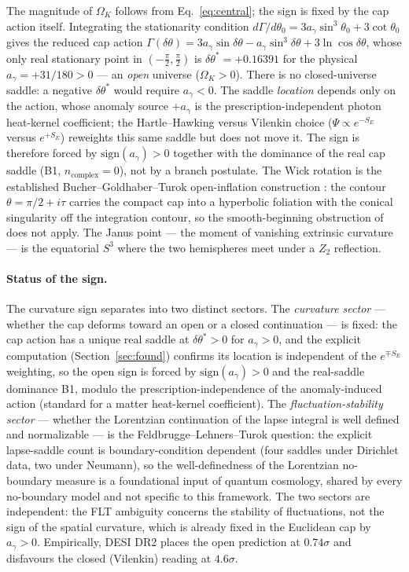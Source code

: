 \documentclass[11pt,a4paper]{article}
\theoremstyle{plain}
\theoremstyle{definition}
\theoremstyle{remark}
\newcommand{\Ok}{\Omega_K}
\newcommand{\ag}{a_\gamma}
\newcommand{\dtheta}{\delta\theta}
\begin{document}
The magnitude of $\Ok$ follows from Eq.~\eqref{eq:central}; the sign is fixed by the cap action
itself. Integrating the stationarity condition $d\Gamma/d\theta_0 = 3\ag\sin^3\theta_0 +
3\cot\theta_0$ gives the reduced cap action $\Gamma(\dtheta) = 3\ag\sin\dtheta - \ag\sin^3\dtheta
+ 3\ln\cos\dtheta$, whose only real stationary point in $(-\tfrac\pi2,\tfrac\pi2)$ is
$\dtheta^* = +0.16391$ for the physical $\ag = +31/180 > 0$ --- an \emph{open} universe
($\Ok>0$). There is no closed-universe saddle: a negative $\dtheta^*$ would require $\ag<0$. The
saddle \emph{location} depends only on the action, whose anomaly source $+\ag$ is the
prescription-independent photon heat-kernel coefficient; the Hartle--Hawking versus Vilenkin
choice ($\Psi \propto e^{-S_E}$ versus $e^{+S_E}$) reweights this same saddle but does not move
it. The sign is therefore forced by $\mathrm{sign}(\ag) > 0$ together with the dominance of the
real cap saddle (B1, $n_{\mathrm{complex}}=0$), not by a branch postulate. The Wick
rotation is the established Bucher--Goldhaber--Turok open-inflation construction
\cite{BGT1995,HawkingTurok1998}: the contour $\theta = \pi/2 + i\tau$ carries the compact cap
into a hyperbolic foliation with the conical singularity off the integration contour, so the
smooth-beginning obstruction of \cite{Feldbrugge2017} does not apply. The Janus point --- the
moment of vanishing extrinsic curvature \cite{Barbour2014} --- is the equatorial $S^3$ where the
two hemispheres meet under a $Z_2$ reflection.

\paragraph{Status of the sign.} The curvature sign separates into two distinct sectors. The
\emph{curvature sector} --- whether the cap deforms toward an open or a closed continuation ---
is fixed: the cap action has a unique real saddle at $\dtheta^* > 0$ for $\ag>0$, and the
explicit computation (Section~\ref{sec:found}) confirms its location is independent of the
$e^{\mp S_E}$ weighting, so the open sign is forced by $\mathrm{sign}(\ag)>0$ and the real-saddle
dominance B1, modulo the prescription-independence of the anomaly-induced action (standard for a
matter heat-kernel coefficient). The \emph{fluctuation-stability sector} --- whether the
Lorentzian continuation of the lapse integral is well defined and normalizable --- is the
Feldbrugge--Lehners--Turok question: the explicit lapse-saddle count is boundary-condition
dependent (four saddles under Dirichlet data, two under Neumann), so the well-definedness of the
Lorentzian no-boundary measure is a foundational input of quantum cosmology, shared by every
no-boundary model and not specific to this framework. The two sectors are independent: the FLT
ambiguity concerns the stability of fluctuations, not the sign of the spatial curvature, which is
already fixed in the Euclidean cap by $\ag>0$. Empirically, DESI DR2 places the open prediction
at $0.74\sigma$ and disfavours the closed (Vilenkin) reading at $4.6\sigma$.
\end{document}
